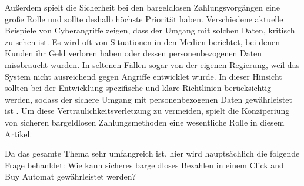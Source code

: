 Außerdem spielt die Sicherheit bei den bargeldlosen Zahlungsvorgängen eine große Rolle und sollte
deshalb höchste Priorität haben. Verschiedene aktuelle Beispiele von Cyberangriffe zeigen, dass der 
Umgang mit solchen Daten, kritisch zu sehen ist. Es wird oft von Situationen in den Medien berichtet,
bei denen Kunden ihr Geld verloren haben oder dessen personenbezogenen Daten missbraucht wurden. 
In seltenen Fällen sogar von der eigenen Regierung, weil das System nicht ausreichend gegen Angriffe entwicklet wurde.
In dieser Hinsicht sollten bei der Entwicklung spezifische und klare Richtlinien berücksichtig werden,
sodass der sichere Umgang mit personenbezogenen Daten gewährleistet ist \cite{refart:TRVR}. Um diese 
Vertraulichkeitsverletzung zu vermeiden, spielt die Konziperiung von sicheren bargeldlosen Zahlungsmethoden 
eine wesentliche Rolle in diesem Artikel. 

Da das gesamte Thema sehr umfangreich ist, hier wird hauptsächlich die folgende Frage behanldet: 
Wie kann sicheres bargeldloses Bezahlen in einem Click and Buy Automat gewährleistet werden?